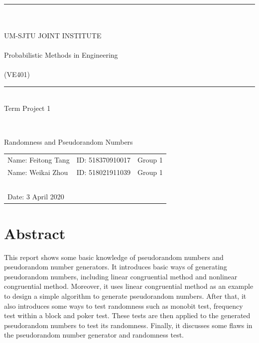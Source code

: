 \documentclass[a4paper]{article}
\begin{document}
\begin{large}
	\begin{center}
	~\\ ~\\ ~\\ ~\\ ~\\ ~\\ \rule[-1pt]{10.3cm}{0.05em} \\~\\UM-SJTU JOINT INSTITUTE\\~\\Probabilistic Methods in
Engineering\\~\\(VE401)	~\\ \rule[-1pt]{10.3cm}{0.05em} \vspace{7cm} \\Term Project 1
	\end{center}
\end{large}
~\\

\begin{large}
	\begin{center}
	Randomness and Pseudorandom Numbers
	\end{center}
\end{large}
\vspace{5cm}

\begin{tabular}{l l l}
	Name: Feitong Tang&ID: 518370910017&Group 1\\
	Name: Weikai Zhou&ID: 518021911039&Group 1\\
     ~\\
	Date: 3 April 2020
\end{tabular}


\newpage

\section{Abstract}
	This report shows some basic knowledge of pseudorandom numbers and pseudorandom number generators. It introduces basic ways of generating pseudorandom numbers, including linear congruential method and nonlinear congruential method. Moreover, it uses linear congruential method as an example to design a simple algorithm to generate pseudorandom numbers. After that, it also introduces some ways to test randomness such as monobit test, frequency test within a block and poker test. These tests are then applied to the generated pseudorandom numbers to test its randomness. Finally, it discusses some flaws in the pseudorandom number generator and randomness test.
\\
\end{document}

